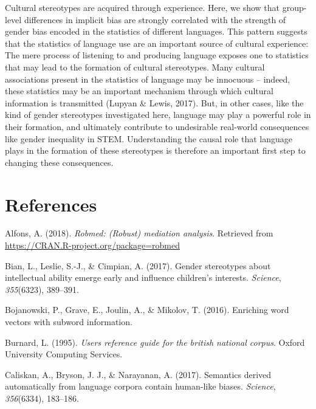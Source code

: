 \documentclass[man,floatsintext]{apa6}
\begin{document}
Cultural stereotypes are acquired through experience. Here, we show that group-level differences in implicit bias are strongly correlated with the strength of gender bias encoded in the statistics of different languages. This pattern suggests that the statistics of language use are an important source of cultural experience: The mere process of listening to and producing language exposes one to statistics that may lead to the formation of cultural stereotypes. Many cultural associations present in the statistics of language may be innocuous -- indeed, these statistics may be an important mechanism through which cultural information is transmitted (Lupyan \& Lewis, 2017). But, in other cases, like the kind of gender stereotypes investigated here, language may play a powerful role in their formation, and ultimately contribute to undesirable real-world consequences like gender inequality in STEM. Understanding the causal role that language plays in the formation of these stereotypes is therefore an important first step to changing these consequences.

\newpage

\hypertarget{references}{%
\section{References}\label{references}}

\begingroup
\setlength{\parindent}{-0.5in}
\setlength{\leftskip}{0.5in}

\hypertarget{refs}{}
\leavevmode\hypertarget{ref-robmed}{}%
Alfons, A. (2018). \emph{Robmed: (Robust) mediation analysis}. Retrieved from \url{https://CRAN.R-project.org/package=robmed}

\leavevmode\hypertarget{ref-bian2017gender}{}%
Bian, L., Leslie, S.-J., \& Cimpian, A. (2017). Gender stereotypes about intellectual ability emerge early and influence children's interests. \emph{Science}, \emph{355}(6323), 389--391.

\leavevmode\hypertarget{ref-bojanowski2016enriching}{}%
Bojanowski, P., Grave, E., Joulin, A., \& Mikolov, T. (2016). Enriching word vectors with subword information.

\leavevmode\hypertarget{ref-burnard1995users}{}%
Burnard, L. (1995). \emph{Users reference guide for the british national corpus}. Oxford University Computing Services.

\leavevmode\hypertarget{ref-caliskan2017semantics}{}%
Caliskan, A., Bryson, J. J., \& Narayanan, A. (2017). Semantics derived automatically from language corpora contain human-like biases. \emph{Science}, \emph{356}(6334), 183--186.
\end{document}
